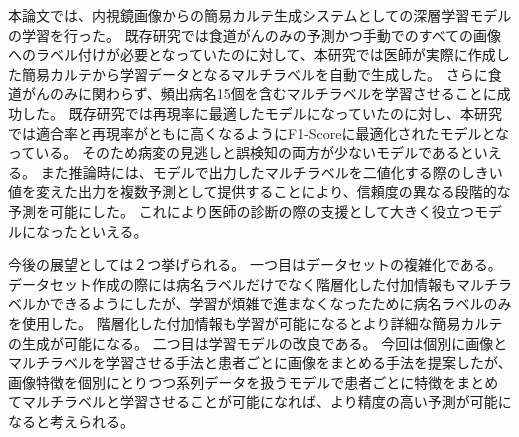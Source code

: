 本論文では、内視鏡画像からの簡易カルテ生成システムとしての深層学習モデルの学習を行った。
既存研究では食道がんのみの予測かつ手動でのすべての画像へのラベル付けが必要となっていたのに対して、本研究では医師が実際に作成した簡易カルテから学習データとなるマルチラベルを自動で生成した。
さらに食道がんのみに関わらず、頻出病名15個を含むマルチラベルを学習させることに成功した。
既存研究では再現率に最適したモデルになっていたのに対し、本研究では適合率と再現率がともに高くなるようにF1-Scoreに最適化されたモデルとなっている。
そのため病変の見逃しと誤検知の両方が少ないモデルであるといえる。
また推論時には、モデルで出力したマルチラベルを二値化する際のしきい値を変えた出力を複数予測として提供することにより、信頼度の異なる段階的な予測を可能にした。
これにより医師の診断の際の支援として大きく役立つモデルになったといえる。

今後の展望としては２つ挙げられる。
一つ目はデータセットの複雑化である。
データセット作成の際には病名ラベルだけでなく階層化した付加情報もマルチラベルかできるようにしたが、学習が煩雑で進まなくなったために病名ラベルのみを使用した。
階層化した付加情報も学習が可能になるとより詳細な簡易カルテの生成が可能になる。
二つ目は学習モデルの改良である。
今回は個別に画像とマルチラベルを学習させる手法と患者ごとに画像をまとめる手法を提案したが、画像特徴を個別にとりつつ系列データを扱うモデルで患者ごとに特徴をまとめてマルチラベルと学習させることが可能になれば、より精度の高い予測が可能になると考えられる。
